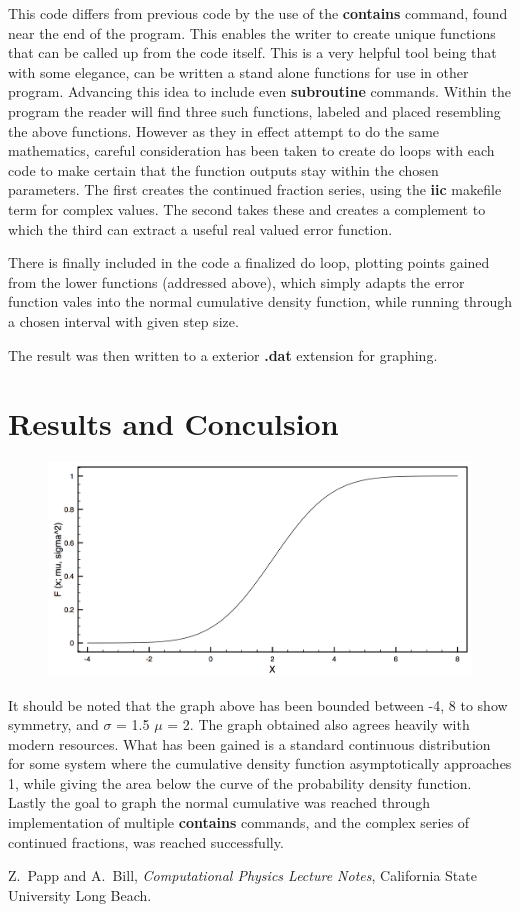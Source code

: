 \documentclass[12pt,letterpaper,notitlepage]{article}
\begin{document}
This code differs from previous code by the use of the \textbf{contains} command, found near the end of the program. This enables the writer to create unique functions that can be called up from the code itself. This is a very helpful tool being that with some elegance, can be written a stand alone functions for use in other program. Advancing this idea to include even \textbf{subroutine} commands. Within the program the reader will find three such functions, labeled and placed resembling the above functions. However as they in effect attempt to do the same mathematics, careful consideration has been taken to create do loops with each code to make certain that the function outputs stay within the chosen parameters. The first creates the continued fraction series, using the \textbf{iic} makefile term for complex values. The second takes these and creates a complement to which the third can extract a useful real valued error function.  

There is finally included in the code a finalized do loop, plotting points gained from the lower functions (addressed above), which simply adapts the error function vales into the normal cumulative density function, while running through a chosen interval with given step size. 

The result was then written to a exterior \textbf{.dat} extension for graphing. 
\newpage
\section{Results and Conculsion}
	\begin{figure}[htb]
		\includegraphics[width=1.\textwidth]{NCDF.png}
	\end{figure}  
It should be noted that the graph above has been bounded between -4, 8 to show symmetry, and $\sigma$ = 1.5 $\mu$ = 2. The graph obtained also agrees heavily with modern resources. What has been gained is a standard continuous distribution for some system where the cumulative density function asymptotically approaches 1, while giving the area below the curve of the probability density function.  Lastly the goal to graph the normal cumulative was reached through implementation of multiple \textbf{contains} commands, and the complex series of continued fractions, was reached successfully.        
\newpage
\begin{thebibliography}{}
	Z.~Papp and A.~Bill, {\it Computational Physics Lecture Notes}, California State University Long Beach.

\end{thebibliography}
\end{document}
